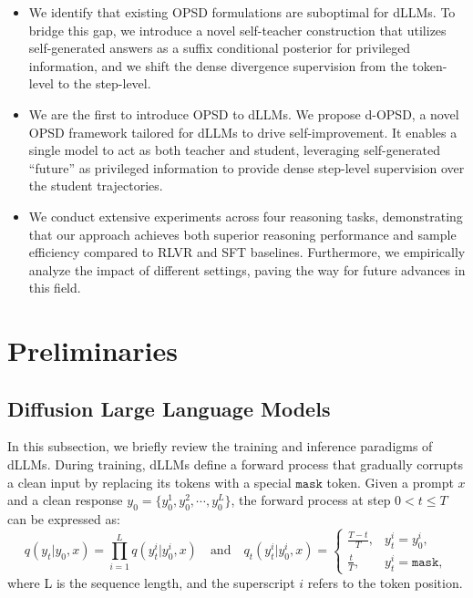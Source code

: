 \documentclass{llmxive}
\providecommand{\mask}{{\texttt{mask}}}
\begin{document}
\begin{itemize}
    \item We identify that existing OPSD formulations are suboptimal for dLLMs. To bridge this gap, we introduce a novel self-teacher construction that utilizes self-generated answers as a suffix conditional posterior for privileged information, and we shift the dense divergence supervision from the token-level to the step-level.
    \item We are the first to introduce OPSD to dLLMs. We propose d-OPSD, a novel OPSD framework tailored for dLLMs to drive self-improvement. It enables a single model to act as both teacher and student, leveraging self-generated ``future'' as privileged information to provide dense step-level supervision over the student trajectories.
    \item We conduct extensive experiments across four reasoning tasks, demonstrating that our approach achieves both superior reasoning performance and sample efficiency compared to RLVR and SFT baselines. Furthermore, we empirically analyze the impact of different settings, paving the way for future advances in this field.  
\end{itemize}


\section{Preliminaries}


\subsection{Diffusion Large Language Models}


In this subsection, we briefly review the training and inference paradigms of dLLMs. During training, dLLMs define a forward process that gradually corrupts a clean input by replacing its tokens with a special $\mask$ token. Given a prompt $x$ and a clean response $y_0 = \{y_0^1, y_0^2, \cdots, y_0^L\}$, the forward process at step $0<t \leq T$ can be expressed as:
\begin{equation}
    q(y_t|y_0,x) = \prod_{i=1}^L q(y_t^i|y_0^i, x) \quad \text{and} \quad q_t(y_t^i|y_0^i, x) = 
\begin{cases} 
\frac{T - t}{T}, & y_t^i = y_0^i, \\
\frac{t}{T}, & y_t^i = \mask,
\end{cases}
\end{equation}
where L is the sequence length, and the superscript $i$ refers to the token position. 
\end{document}
